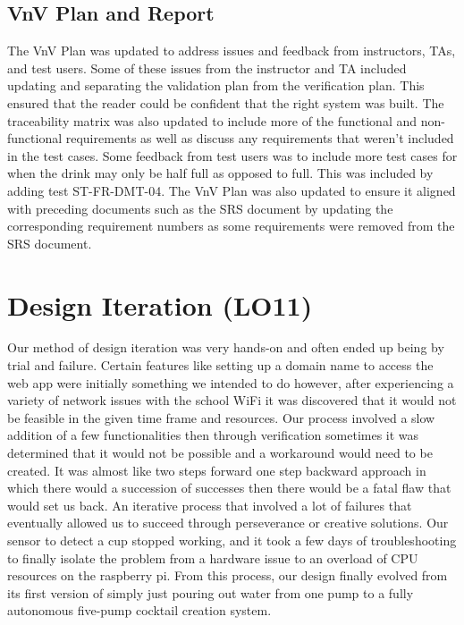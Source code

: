 \documentclass{article}
\begin{document}
\subsection{VnV Plan and Report}
The VnV Plan was updated to address issues and feedback from instructors, TAs, and test users. Some of these issues from the instructor and TA included updating and separating the validation plan from the verification plan. This ensured that the reader could be confident that the right system was built. The traceability matrix was also updated to include more of the functional and non-functional requirements as well as discuss any requirements that weren't included in the test cases. Some feedback from test users was to include more test cases for when the drink may only be half full as opposed to full. This was included by adding test ST-FR-DMT-04. The VnV Plan was also updated to ensure it aligned with preceding documents such as the SRS document by updating the corresponding requirement numbers as some requirements were removed from the SRS document.\\


\section{Design Iteration (LO11)}
Our method of design iteration was very hands-on and often ended up being by trial and failure. Certain features like setting up a domain name to access the web app were initially something we intended to do however, after experiencing a variety of network issues with the school WiFi it was discovered that it would not be feasible in the given time frame and resources. Our process involved a slow addition of a few functionalities then through verification sometimes it was determined that it would not be possible and a workaround would need to be created. It was almost like two steps forward one step backward approach in which there would a succession of successes then there would be a fatal flaw that would set us back. An iterative process that involved a lot of failures that eventually allowed us to succeed through perseverance or creative solutions. Our sensor to detect a cup stopped working, and it took a few days of troubleshooting to finally isolate the problem from a hardware issue to an overload of CPU resources on the raspberry pi. From this process, our design finally evolved from its first version of simply just pouring out water from one pump to a fully autonomous five-pump cocktail creation system. 
\end{document}
